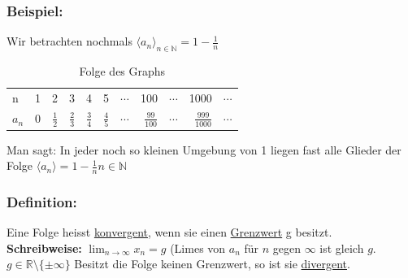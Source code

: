 \documentclass[11pt]{amsart}
\theoremstyle{remark}
\begin{document}
\subsubsection*{Beispiel:}
\begin{center}
Wir betrachten nochmals $\langle a_n \rangle_{n \in \mathbb{N}} = 1 - \frac 1n$\\
\begin{figure}[h]
  \centering
 \end{figure}
\begin{table}[h]
\caption{Folge des Graphs}
\begin{tabular}[t]{lrrrrrrrrrr}
n & 1 & 2 & 3 & 4 & 5 & $\dotsb$ & 100& $\dotsb$ & 1000 & $\dotsb$ \\
$a_n$ & 0 & $\frac 12$ & $\frac 23$&$\frac 34$&$\frac 45$&$\dotsb$&$\frac {99}{100}$&$\dotsb$&$\frac {999}{1000}$&$\dotsb$\\
\end{tabular}
\label{default}
\end{table}
\end{center}
Man sagt: In jeder noch so kleinen Umgebung von 1 liegen fast alle Glieder der Folge $\langle a_n\rangle = 1 -\frac 1n n \in \mathbb{N}$
\subsubsection*{Definition:}
Eine Folge heisst \underline{konvergent}, wenn sie einen \underline{Grenzwert} g besitzt.\\
\textbf{Schreibweise:} $\lim_{n \to \infty}x_n = g$ (Limes von $a_n$ f\"{u}r $n$ gegen $\infty $ ist gleich $g$. $g \in \mathbb{R} \setminus \lbrace \pm\infty \rbrace$
Besitzt die Folge keinen Grenzwert, so ist sie \underline{divergent}.
\end{document}
